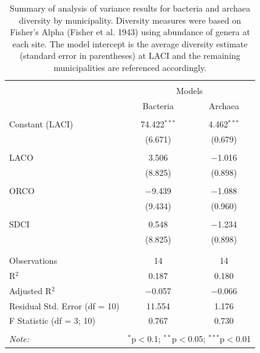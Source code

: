 \documentclass[letterpaper,12pt]{article}\usepackage[]{graphicx}\usepackage[]{color}
\begin{document}
\begin{table}[!htbp] \centering 
  \caption{Summary of analysis of variance results for bacteria and archaea diversity by municipality.  Diversity measures were based on Fisher's Alpha (Fisher et al. 1943) using abundance of genera at each site. The model intercept is the average diversity estimate (standard error in parentheses) at LACI and the remaining municipalities are referenced accordingly.} 
  \label{} 
\begin{tabular}{@{\extracolsep{5pt}}lcc} 
\\[-1.8ex]\hline 
\hline \\[-1.8ex] 
 & \multicolumn{2}{c}{Models} \\ 
\cline{2-3} 
 & Bacteria & Archaea \\ 
\hline \\[-1.8ex] 
 Constant (LACI) & 74.422$^{***}$ & 4.462$^{***}$ \\ 
  & (6.671) & (0.679) \\ 
  & & \\ 
 LACO & 3.506 & $-$1.016 \\ 
  & (8.825) & (0.898) \\ 
  & & \\ 
 ORCO & $-$9.439 & $-$1.088 \\ 
  & (9.434) & (0.960) \\ 
  & & \\ 
 SDCI & 0.548 & $-$1.234 \\ 
  & (8.825) & (0.898) \\ 
  & & \\ 
\hline \\[-1.8ex] 
Observations & 14 & 14 \\ 
R$^{2}$ & 0.187 & 0.180 \\ 
Adjusted R$^{2}$ & $-$0.057 & $-$0.066 \\ 
Residual Std. Error (df = 10) & 11.554 & 1.176 \\ 
F Statistic (df = 3; 10) & 0.767 & 0.730 \\ 
\hline 
\hline \\[-1.8ex] 
\textit{Note:}  & \multicolumn{2}{r}{$^{*}$p$<$0.1; $^{**}$p$<$0.05; $^{***}$p$<$0.01} \\ 
\end{tabular} 
\end{table} 
\end{document}
